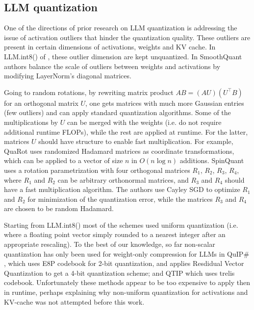 \subsection{LLM quantization}\label{sec:llm_review}

One of the directions of prior research on LLM quantization is addressing the issue of activation outliers that hinder the quantization quality. These outliers are present in certain dimensions of activations, weights and KV cache. In LLM.int8() of \cite{dettmers2022}, these outlier dimension are kept unquantized. In SmoothQuant~\cite{xiao2024} authors balance the scale of outliers between weights and activations by modifying LayerNorm's diagonal matrices.

Going to random rotations, by rewriting matrix product $AB=(AU) (U^\top B)$ for an orthogonal matrix $U$, one gets matrices with much more Gaussian entries (few outliers) and can apply standard quantization algorithms. Some of the multiplications by $U$ can be merged with the weights (i.e. do not require additional runtime FLOPs), while the rest are applied at runtime. For the latter, matrices $U$ should have structure to enable fast multiplication. For example, QuaRot \cite{ashkboos2024} uses randomized Hadamard matrices as coordinate transformations, which can be applied to a vector of size $n$ in $O(n \log n)$ additions. SpinQuant \cite{liu2024} uses a rotation parametrization with four orthogonal matrices $R_1$, $R_2$, $R_3$, $R_4$, where $R_1$ and $R_2$ can be arbitrary orthonormal matrices, and $R_3$ and $R_4$ should have a fast multiplication algorithm. The authors use Cayley SGD \cite{li2020} to optimize $R_1$ and $R_2$ for minimization of the quantization error, while the matrices $R_3$ and $R_4$ are chosen to be random Hadamard. 

Starting from LLM.int8() most of the schemes used uniform quantization (i.e. where a floating point vector simply rounded to a nearest integer after an appropriate rescaling). 
To the best of our knowledge, so far non-scalar quantization has only been used for weight-only compression for LLMs in QuIP\# \cite{tseng2024}, which uses E8P codebook for 2-bit quantization, and applies Resdidual Vector Quantization \cite{Juang1982MultipleSV} to get a 4-bit quantization scheme; and QTIP \cite{tseng2024qtip} which uses trelis codebook. Unfortunately these methods appear to be too expensive to apply then in runtime, perhaps explaining why non-uniform quantization for activations and KV-cache was not attempted before this work.


